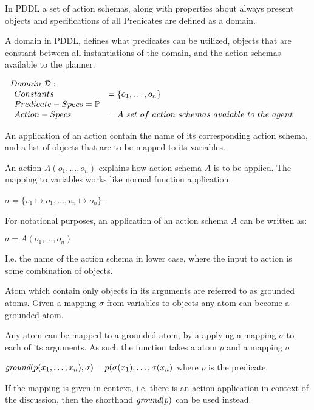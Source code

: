\documentclass[../Master.tex]{subfiles}
\begin{document}
In PDDL a set of action schemas, along with properties about always present objects and specifications of all Predicates are defined as a domain.

\begin{definition} A domain in PDDL, defines what predicates can be utilized, objects that are constant between all instantiations of the domain, and the action schemas available to the planner.
	
$
\begin{array}{ll}
Domain~\mathcal{D}: & \\

\begin{array}{ll}
Constants & = \{o_1,\dots,o_n\}			 \\  
Predicate-Specs = \preds \\
Action-Specs & = A~set~of~action~schemas~avaiable~to~the~agent \\
\end{array}
\end{array}$
\end{definition}


	

An application of an action contain the name of its corresponding action schema, and a list of objects that are to be mapped to its variables.
\begin{definition} 
	An action $A(o_1,\dots,o_n)$ explains how action schema $A$ is to be applied. The mapping to variables works like normal function application. 
	
	$\sigma = \{ v_1 \mapsto o_1,\dots,v_n \mapsto o_n \}$.
	
	For notational purposes, an application of an action schema $A$ can be written as:
	
	$a = A(o_1,\dots,o_n)$ 
	
	I.e. the name of the action schema in lower case, where the input to action is some combination of objects.
	
	
	
\end{definition}


Atom which contain only objects in its arguments are referred to as grounded atoms. Given a mapping $\sigma$ from variables to objects any atom can become a grounded atom.
\begin{definition}\label{def:pddl:ground-func}
	Any atom can be mapped to a grounded atom, by a applying a mapping $\sigma$ to each of its arguments. As such the \ground function takes a atom $p$ and a mapping $\sigma$
	
		$\textit{ground}(p(x_1,\dots,x_n),\sigma) = p(\sigma(x_1),\dots,\sigma(x_n)$ where $p$ is the predicate.
		
	If the mapping is given in context, i.e. there is an action application in context of the discussion, then the shorthand $\textit{ground}(p)$ can be used instead.
\end{definition}
\end{document}
